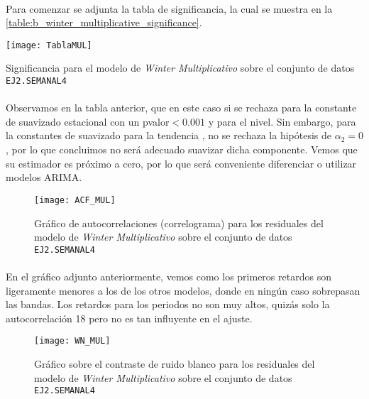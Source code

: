 \documentclass[a4paper, spanish]{article}
\begin{document}
      \paragraph{}
      Para comenzar se adjunta la tabla de significancia, la cual se muestra en la \autoref{table:b_winter_multiplicative_significance}.

      \begin{table}[htb!]
        \centering
        \texttt{[image: TablaMUL]}
        \caption{Significancia para el modelo de \emph{Winter Multiplicativo} sobre el conjunto de datos \texttt{EJ2.SEMANAL4}}
        \label{table:b_winter_multiplicative_significance}
      \end{table}

      \paragraph{}
      Observamos en la tabla anterior, que en este caso si se rechaza para la constante de suavizado estacional con un pvalor$ <0.001$ y para el nivel. Sin embargo, para la constantes de suavizado para la tendencia , no se rechaza la hipótesis de $\alpha_2 =0$, por lo que concluimos no será adecuado suavizar dicha componente. Vemos que su estimador es próximo a cero, por lo que será conveniente diferenciar o utilizar modelos ARIMA.

      \begin{figure}[htb!]
        \centering
        \texttt{[image: ACF\_MUL]}
        \caption{Gráfico de autocorrelaciones (correlograma) para los residuales del modelo de \emph{Winter Multiplicativo} sobre el conjunto de datos \texttt{EJ2.SEMANAL4}}
        \label{img:b_winter_multiplicative_residuals_correlogram}
      \end{figure}

      \paragraph{}
      En el gráfico adjunto anteriormente, vemos como los primeros retardos son ligeramente menores a los de los otros modelos, donde en ningún caso sobrepasan las bandas. Los retardos para los periodos no son muy altos, quizás solo la autocorrelación 18 pero no es tan influyente en el ajuste.

      \begin{figure}[htb!]
        \centering
        \texttt{[image: WN\_MUL]}
        \caption{Gráfico sobre el contraste de ruido blanco para los residuales del modelo de \emph{Winter Multiplicativo} sobre el conjunto de datos \texttt{EJ2.SEMANAL4}}
        \label{img:b_winter_multplicative_test_white_noise}
      \end{figure}
\end{document}
